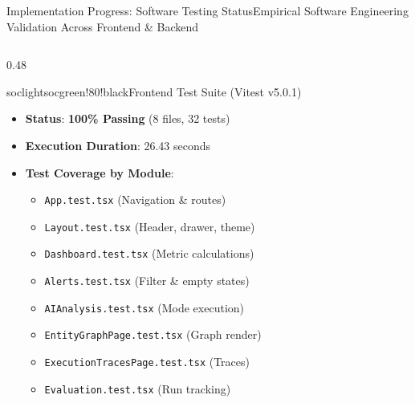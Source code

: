 \documentclass[aspectratio=169, 10pt]{beamer}
\begin{document}
\begin{frame}{Implementation Progress: Software Testing Status}{Empirical Software Engineering Validation Across Frontend \& Backend}
  \begin{columns}[T]
    \begin{column}{0.48\textwidth}
      \begin{cardbox}{soclight}{socgreen!80!black}{Frontend Test Suite (Vitest v5.0.1)}
        \begin{itemize}\setlength{\itemsep}{1.5pt}
          \item \textbf{Status}: \textcolor{socgreen}{\textbf{100\% Passing}} (8 files, 32 tests)
          \item \textbf{Execution Duration}: 26.43 seconds
          \item \textbf{Test Coverage by Module}:
            \begin{itemize}\tiny
              \item \texttt{App.test.tsx} (Navigation \& routes)
              \item \texttt{Layout.test.tsx} (Header, drawer, theme)
              \item \texttt{Dashboard.test.tsx} (Metric calculations)
              \item \texttt{Alerts.test.tsx} (Filter \& empty states)
              \item \texttt{AIAnalysis.test.tsx} (Mode execution)
              \item \texttt{EntityGraphPage.test.tsx} (Graph render)
              \item \texttt{ExecutionTracesPage.test.tsx} (Traces)
              \item \texttt{Evaluation.test.tsx} (Run tracking)
            \end{itemize}
        \end{itemize}
      \end{cardbox}
    \end{column}


\end{columns}
\end{frame}
\end{document}
